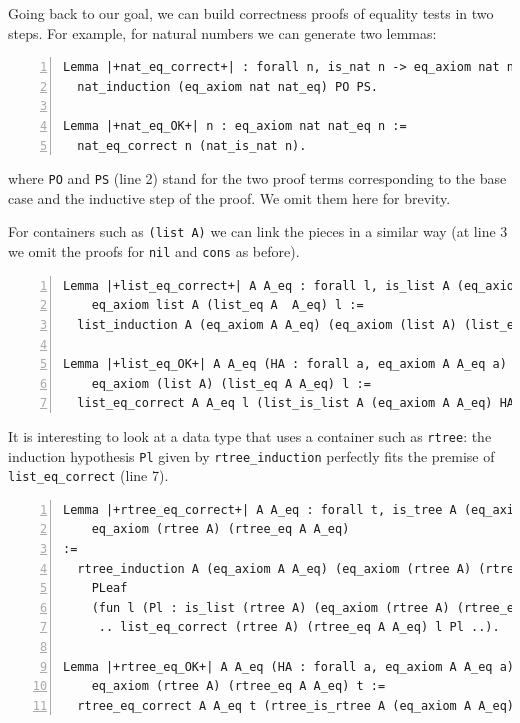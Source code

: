 \documentclass[a4paper,UKenglish,cleveref, autoref]{lipics-v2019}
\begin{document}
Going back to our goal, we can build correctness
proofs of equality tests in two steps.
For example, for natural numbers we can generate two
lemmas:

\begin{lstlisting}[numbers=left]
Lemma |+nat_eq_correct+| : forall n, is_nat n -> eq_axiom nat nat_eq n :=
  nat_induction (eq_axiom nat nat_eq) PO PS.

Lemma |+nat_eq_OK+| n : eq_axiom nat nat_eq n :=
  nat_eq_correct n (nat_is_nat n).
\end{lstlisting}

\noindent
where \lstinline+PO+ and \lstinline+PS+ (line 2) stand for
the two proof terms corresponding to the base case and the inductive
step of the proof. We omit them here for brevity.

For containers such as \lstinline+(list A)+ we can link the pieces in a
similar way (at line 3 we omit the proofs for
\lstinline+nil+ and \lstinline+cons+ as before).

\begin{lstlisting}[numbers=left]
Lemma |+list_eq_correct+| A A_eq : forall l, is_list A (eq_axiom A  A_eq) l ->
    eq_axiom list A (list_eq A  A_eq) l :=
  list_induction A (eq_axiom A A_eq) (eq_axiom (list A) (list_eq A A_eq)) Pnil Pcons.

Lemma |+list_eq_OK+| A A_eq (HA : forall a, eq_axiom A A_eq a) l :
    eq_axiom (list A) (list_eq A A_eq) l :=
  list_eq_correct A A_eq l (list_is_list A (eq_axiom A A_eq) HA l).
\end{lstlisting}

\noindent
It is interesting to look at a data type that uses a container such as
\lstinline+rtree+: the induction hypothesis
\lstinline+Pl+
given by \lstinline+rtree_induction+ perfectly fits
the premise of \lstinline+list_eq_correct+ (line 7).

\begin{lstlisting}[numbers=left]
Lemma |+rtree_eq_correct+| A A_eq : forall t, is_tree A (eq_axiom A A_eq) t ->
    eq_axiom (rtree A) (rtree_eq A A_eq)
:=
  rtree_induction A (eq_axiom A A_eq) (eq_axiom (rtree A) (rtree_eq Afa))
    PLeaf
    (fun l (Pl : is_list (rtree A) (eq_axiom (rtree A) (rtree_eq A A_eq)) l) =>
     .. list_eq_correct (rtree A) (rtree_eq A A_eq) l Pl ..).

Lemma |+rtree_eq_OK+| A A_eq (HA : forall a, eq_axiom A A_eq a) t :
    eq_axiom (rtree A) (rtree_eq A A_eq) t :=
  rtree_eq_correct A A_eq t (rtree_is_rtree A (eq_axiom A A_eq) HA t).
\end{lstlisting}
\end{document}
